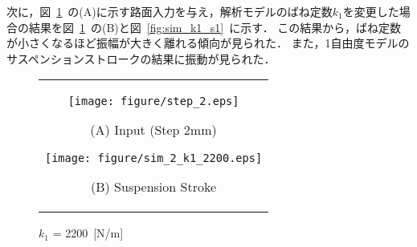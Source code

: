 \documentclass[a4paper,12pt]{article_vdlab_sotsuron}
\begin{document}
\newpage
次に，図~\ref{fig:sim_k1_s}~の(A)に示す路面入力を与え，解析モデルのばね定数$k_1$を変更した場合の結果を図~\ref{fig:sim_k1_s}~の(B)と図~\ref{fig:sim_k1_s1}~に示す．
この結果から，ばね定数が小さくなるほど振幅が大きく離れる傾向が見られた．
また，1自由度モデルのサスペンションストロークの結果に振動が見られた．
\vspace{15mm}
\begin{figure}[h]
    \begin{tabular}{c}
      \begin{minipage}{0.45\hsize}
	\begin{center}
	  \texttt{[image: figure/step\_2.eps]}
	\end{center}
	\begin{center}
	  \vspace{2mm}
	  \ (A) Input (Step 2mm)\
	  \end{center}
      \end{minipage}
      \begin{minipage}{0.5\hsize}
	\begin{center}
	  \texttt{[image: figure/sim\_2\_k1\_2200.eps]}
	\end{center}
	\begin{center}
	  \vspace{2mm}
	  \ (B) Suspension Stroke\
	  \end{center}
      \end{minipage}
    \end{tabular}
    \vspace{2mm}
    \caption{$k_1$ = 2200~[N/m]}
    \label{fig:sim_k1_s}
\end{figure}
\end{document}
